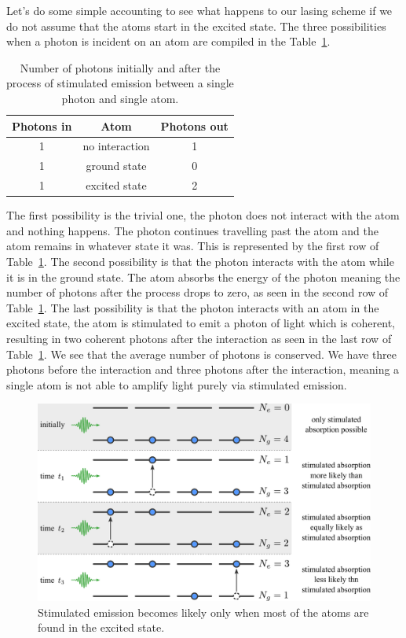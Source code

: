Let's do some simple accounting to see what happens to our lasing scheme if we do not assume that the atoms start in the excited state.
The three possibilities when a photon is incident on an atom are compiled in the Table~\ref{tab:5-3_three_possibilities}.
\begin{table}[h]
    \centering
    \begin{tabular}{c|c|c}
        Photons in & Atom & Photons out \\
        \hline
        1 & no interaction & 1 \\
        \hline
        1 & ground state & 0 \\
        1 & excited state & 2 \\
    \end{tabular}
    \caption[Stimulated emission accounting]{Number of photons initially and after the process of stimulated emission between a single photon and single atom.}
    \label{tab:5-3_three_possibilities}
\end{table}
The first possibility is the trivial one, the photon does not interact with the atom and nothing happens.
The photon continues travelling past the atom and the atom remains in whatever state it was.
This is represented by the first row of Table~\ref{tab:5-3_three_possibilities}.
The second possibility is that the photon interacts with the atom while it is in the ground state.
The atom absorbs the energy of the photon meaning the number of photons after the process drops to zero, as seen in the second row of Table~\ref{tab:5-3_three_possibilities}.
The last possibility is that the photon interacts with an atom in the excited state, the atom is stimulated to emit a photon of light which is coherent, resulting in two coherent photons after the interaction as seen in the last row of Table~\ref{tab:5-3_three_possibilities}.
We see that the average number of photons is conserved.
We have three photons before the interaction and three photons after the interaction, meaning a single atom is not able to amplify light purely via stimulated emission.

\begin{figure}[t]
    \centering
    \includegraphics[width=\textwidth]{lesson5/5-3_population_inversion.pdf}
    \caption[Population inversion]{Stimulated emission becomes likely only when most of the atoms are found in the excited state.}
    \label{fig:5-3_population_inversion}
\end{figure}

